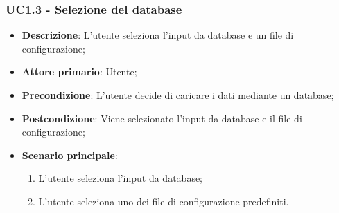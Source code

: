 \subsubsection{UC1.3 - Selezione del database}
\label{ssub:uc1.3}
\begin{itemize}
    \item \textbf{Descrizione}: L'utente seleziona l'input da database e un file di configurazione;
	
    \item \textbf{Attore primario}: Utente;
    
    \item \textbf{Precondizione}:   L'utente decide di caricare i dati mediante un database;
    \item \textbf{Postcondizione}:  Viene selezionato l'input da database e il file di configurazione;

	\item \textbf{Scenario principale}:
		\begin{enumerate}
			\item L'utente seleziona l'input da database;
			\item L'utente seleziona uno dei file di configurazione predefiniti.
        \end{enumerate}

\end{itemize}

